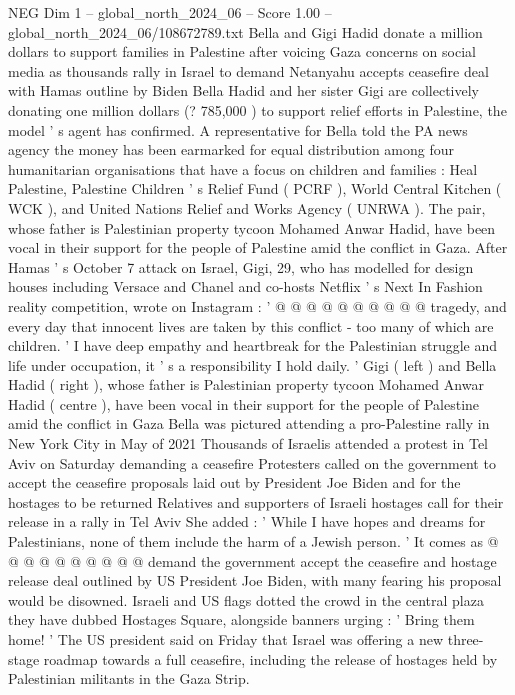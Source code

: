 \begin{textsample}{NEG Dim 1 – global\_north\_2024\_06 – Score 1.00 – global\_north\_2024\_06/108672789.txt}  \label{ex:f1_neg_143}
Bella and Gigi Hadid donate a million dollars to support families in Palestine after voicing Gaza concerns on social media as thousands rally in Israel to demand Netanyahu accepts ceasefire deal with Hamas outline by Biden Bella Hadid and her sister Gigi are collectively donating one million dollars (? 785,000 ) to support relief efforts in Palestine, the model ' s agent has confirmed.
A representative for Bella told the PA news agency the money has been earmarked for equal distribution among four humanitarian organisations that have a focus on children and families : Heal Palestine, Palestine Children ' s Relief Fund ( PCRF ), World Central Kitchen ( WCK ), and United Nations Relief and Works Agency ( UNRWA ).
The pair, whose father is Palestinian property tycoon Mohamed Anwar Hadid, have been vocal in their support for the people of Palestine amid the conflict in Gaza.
After Hamas ' s October 7 attack on Israel, Gigi, 29, who has modelled for design houses including Versace and Chanel and co-hosts Netflix ' s Next In Fashion reality competition, wrote on Instagram : ' @ @ @ @ @ @ @ @ @ @ tragedy, and every day that innocent lives are taken by this conflict - too many of which are children. ' I have deep empathy and heartbreak for the Palestinian struggle and life under occupation, it ' s a responsibility I hold daily. ' Gigi ( left ) and Bella Hadid ( right ), whose father is Palestinian property tycoon Mohamed Anwar Hadid ( centre ), have been vocal in their support for the people of Palestine amid the conflict in Gaza Bella was pictured attending a pro-Palestine rally in New York City in May of 2021 Thousands of Israelis attended a protest in Tel Aviv on Saturday demanding a ceasefire Protesters called on the government to accept the ceasefire proposals laid out by President Joe Biden and for the hostages to be returned Relatives and supporters of Israeli hostages call for their release in a rally in Tel Aviv She added : ' While I have hopes and dreams for Palestinians, none of them include the harm of a Jewish person. ' It comes as @ @ @ @ @ @ @ @ @ @ demand the government accept the ceasefire and hostage release deal outlined by US President Joe Biden, with many fearing his proposal would be disowned.
Israeli and US flags dotted the crowd in the central plaza they have dubbed Hostages Square, alongside banners urging : ' Bring them home! ' The US president said on Friday that Israel was offering a new three-stage roadmap towards a full ceasefire, including the release of hostages held by Palestinian militants in the Gaza Strip.

\end{textsample}
